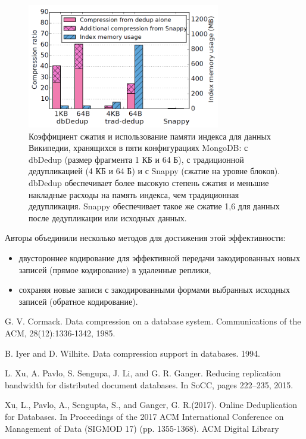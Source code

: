 \documentclass[12pt,a4paper]{article}
\begin{document}
\begin{figure}[h]
\includegraphics[width=0.75\textwidth]{img1_xu17}
\caption{\label{img1_xu17} Коэффициент сжатия и использование памяти индекса для данных Википедии,
хранящихся в пяти конфигурациях MongoDB: с dbDedup (размер фрагмента 1 КБ и 64 Б), с традиционной дедупликацией (4 КБ и 64 Б) и с Snappy (сжатие на уровне блоков). dbDedup обеспечивает более высокую степень сжатия и меньшие накладные расходы на память индекса, чем традиционная дедупликация. Snappy обеспечивает такое же сжатие 1,6 для данных после дедупликации или исходных данных. \cite{xu17}}
\centering
\end{figure}

Авторы объединили несколько методов для достижения этой эффективности:
\begin{itemize}
    \item двустороннее кодирование для эффективной передачи закодированных новых записей (прямое кодирование) в удаленные реплики,
    \item сохраняя новые записи с закодированными формами выбранных исходных записей (обратное кодирование).
\end{itemize}

\begin{thebibliography}{9} 
     G. V. Cormack. Data compression on a database system. Communications of the ACM, 28(12):1336-1342, 1985.

     B. Iyer and D. Wilhite. Data compression support in databases. 1994.

     L. Xu, A. Pavlo, S. Sengupa, J. Li, and G. R. Ganger.
Reducing replication bandwidth for distributed document
databases. In SoCC, pages 222–235, 2015.

   Xu, L., Pavlo, A., Sengupta, S., and Ganger, G. R.(2017). Online Deduplication for Databases. In Proceedings of the 2017 ACM International Conference on Management of Data (SIGMOD 17) (pp. 1355-1368). ACM Digital Library

\end{thebibliography}
\end{document}
